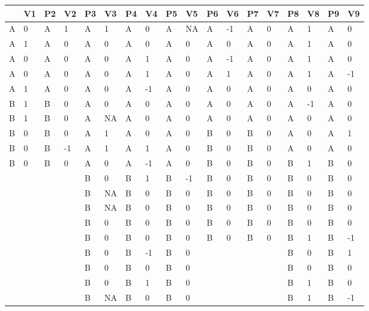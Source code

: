 \documentclass{article}
\begin{document}
\begin{table}

  
\begin{tabular}{l  l  l  l  l  l  l  l  l  l  l  l  l  l  l  l  l  l}

  \topruleP1 & V1 & P2 & V2 & P3 & V3 & P4 & V4 & P5 & V5 & P6 & V6 & P7 & V7 & P8 & V8 & P9 & V9\\ \midrule
A & 0 & A & 1 & A & 1 & A & 0 & A & NA & A & -1 & A & 0 & A & 1 & A & 0\\ \midrule
A & 1 & A & 0 & A & 0 & A & 0 & A & 0 & A & 0 & A & 0 & A & 1 & A & 0\\ \midrule
A & 0 & A & 0 & A & 0 & A & 1 & A & 0 & A & -1 & A & 0 & A & 1 & A & 0\\ \midrule
A & 0 & A & 0 & A & 0 & A & 1 & A & 0 & A & 1 & A & 0 & A & 1 & A & -1\\ \midrule
A & 1 & A & 0 & A & 0 & A & -1 & A & 0 & A & 0 & A & 0 & A & 0 & A & 0\\ \midrule
B & 1 & B & 0 & A & 0 & A & 0 & A & 0 & A & 0 & A & 0 & A & -1 & A & 0\\ \midrule
B & 1 & B & 0 & A & NA & A & 0 & A & 0 & A & 0 & A & 0 & A & 0 & A & 0\\ \midrule
B & 0 & B & 0 & A & 1 & A & 0 & A & 0 & B & 0 & B & 0 & A & 0 & A & 1\\ \midrule
B & 0 & B & -1 & A & 1 & A & 1 & A & 0 & B & 0 & B & 0 & A & 0 & A & 0\\ \midrule
B & 0 & B & 0 & A & 0 & A & -1 & A & 0 & B & 0 & B & 0 & B & 1 & B & 0\\ \midrule
  &   &   &   & B & 0 & B & 1 & B & -1 & B & 0 & B & 0 & B & 0 & B & 0\\ \midrule
  &   &   &   & B & NA & B & 0 & B & 0 & B & 0 & B & 0 & B & 0 & B & 0\\ \midrule
  &   &   &   & B & NA & B & 0 & B & 0 & B & 0 & B & 0 & B & 0 & B & 0\\ \midrule
  &   &   &   & B & 0 & B & 0 & B & 0 & B & 0 & B & 0 & B & 0 & B & 0\\ \midrule
  &   &   &   & B & 0 & B & 0 & B & 0 & B & 0 & B & 0 & B & 1 & B & -1\\ \midrule
  &   &   &   & B & 0 & B & -1 & B & 0 &   &   &   &   & B & 0 & B & 1\\ \midrule
  &   &   &   & B & 0 & B & 0 & B & 0 &   &   &   &   & B & 0 & B & 0\\ \midrule
  &   &   &   & B & 0 & B & 1 & B & 0 &   &   &   &   & B & 1 & B & 0\\ \midrule
  &   &   &   & B & NA & B & 0 & B & 0 &   &   &   &   & B & 1 & B & -1\\ \midrule

\end{tabular}
\end{table}
\end{document}
